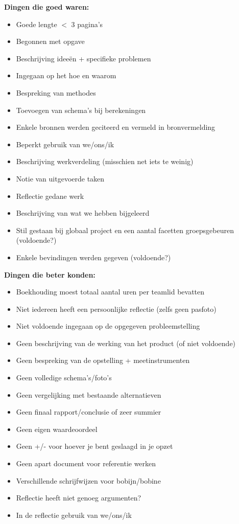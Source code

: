 \textbf{Dingen die goed waren:}
\begin{itemize}
	\item Goede lengte $<$ 3 pagina's
	\item Begonnen met opgave
	\item Beschrijving idee\"en + specifieke problemen
	\item Ingegaan op het hoe en waarom
	\item Bespreking van methodes
	\item Toevoegen van schema's bij berekeningen
	\item Enkele bronnen werden geciteerd en vermeld in bronvermelding
	\item Beperkt gebruik van we/ons/ik
	\item Beschrijving werkverdeling (misschien net iets te weinig)
	\item Notie van uitgevoerde taken
	\item Reflectie gedane werk
	\item Beschrijving van wat we hebben bijgeleerd
	\item Stil gestaan bij globaal project en een aantal facetten groepsgebeuren
		(voldoende?)
	\item Enkele bevindingen werden gegeven (voldoende?)
\end{itemize}

\textbf{Dingen die beter konden:}
\begin{itemize}
	\item Boekhouding moest totaal aantal uren per teamlid bevatten
	\item Niet iedereen heeft een persoonlijke reflectie (zelfs geen pasfoto)
	\item Niet voldoende ingegaan op de opgegeven probleemstelling
	\item Geen beschrijving van de werking van het product (of niet voldoende)
	\item Geen bespreking van de opstelling + meetinstrumenten
	\item Geen volledige schema's/foto's
	\item Geen vergelijking met bestaande alternatieven
	\item Geen finaal rapport/conclusie of zeer summier
	\item Geen eigen waardeoordeel
	\item Geen +/- voor hoever je bent geslaagd in je opzet
	\item Geen apart document voor referentie werken
	\item Verschillende schrijfwijzen voor bobijn/bobine
	\item Reflectie heeft niet genoeg argumenten?
	\item In de reflectie gebruik van we/ons/ik
\end{itemize}

